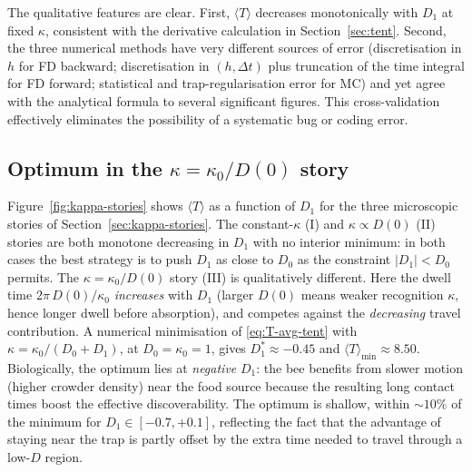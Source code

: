 The qualitative features are clear.
First, $\langle T\rangle$ decreases monotonically with $D_1$ at fixed $\kappa$,
consistent with the derivative calculation in Section~\ref{sec:tent}.
Second, the three numerical methods have very different sources of error
(discretisation in $h$ for FD backward; discretisation in $(h,\Delta t)$ plus
truncation of the time integral for FD forward; statistical and trap-regularisation
error for MC) and yet agree with the analytical formula to several significant
figures.  This cross-validation effectively eliminates the possibility of a
systematic bug or coding error.

\subsection{Optimum in the \texorpdfstring{$\kappa=\kappa_0/D(0)$}{kappa=kappa0/D(0)} story}

Figure~\ref{fig:kappa-stories} shows $\langle T\rangle$ as a function of $D_1$
for the three microscopic stories of Section~\ref{sec:kappa-stories}.  The
constant-$\kappa$ (I) and $\kappa\propto D(0)$ (II) stories are both monotone
decreasing in $D_1$ with no interior minimum: in both cases the best strategy
is to push $D_1$ as close to $D_0$ as the constraint $|D_1|<D_0$ permits.
The $\kappa=\kappa_0/D(0)$ story (III) is qualitatively different.  Here the
dwell time $2\pi\,D(0)/\kappa_0$ \emph{increases} with $D_1$ (larger $D(0)$
means weaker recognition $\kappa$, hence longer dwell before absorption), and
competes against the \emph{decreasing} travel contribution.  A numerical
minimisation of \eqref{eq:T-avg-tent} with $\kappa=\kappa_0/(D_0+D_1)$, at
$D_0=\kappa_0=1$, gives $D_1^{*}\approx -0.45$ and $\langle T\rangle_{\min}\approx 8.50$.
Biologically, the optimum lies at \emph{negative} $D_1$: the bee benefits from
slower motion (higher crowder density) near the food source because the
resulting long contact times boost the effective discoverability.  The
optimum is shallow, within $\sim 10\%$ of the minimum for
$D_1\in[-0.7,+0.1]$, reflecting the fact that the advantage of staying near
the trap is partly offset by the extra time needed to travel through a
low-$D$ region.


